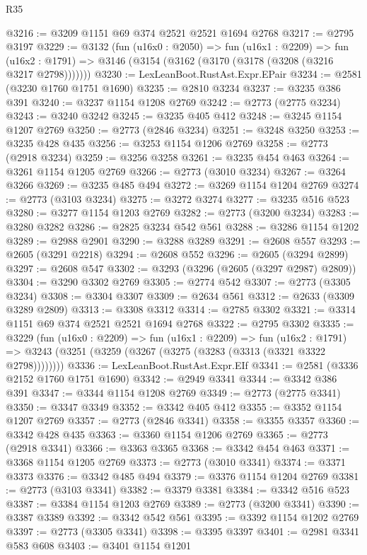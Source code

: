 \begin{lexlean}{R35}
\begin{coremodule}
@3216 := @3209 @1151 @69 @374 @2521 @2521 @1694 @2768
@3217 := @2795 @3197
@3229 := @3132
    (fun (u16x0 : @2050) =>
    fun (u16x1 : @2209) =>
    fun (u16x2 : @1791) => @3146 (@3154 (@3162 (@3170 (@3178 (@3208 (@3216 @3217 @2798)))))))
@3230 := LexLeanBoot.RustAst.Expr.EPair
@3234 := @2581 (@3230 @1760 @1751 @1690)
@3235 := @2810 @3234
@3237 := @3235 @386 @391
@3240 := @3237 @1154 @1208 @2769
@3242 := @2773 (@2775 @3234)
@3243 := @3240 @3242
@3245 := @3235 @405 @412
@3248 := @3245 @1154 @1207 @2769
@3250 := @2773 (@2846 @3234)
@3251 := @3248 @3250
@3253 := @3235 @428 @435
@3256 := @3253 @1154 @1206 @2769
@3258 := @2773 (@2918 @3234)
@3259 := @3256 @3258
@3261 := @3235 @454 @463
@3264 := @3261 @1154 @1205 @2769
@3266 := @2773 (@3010 @3234)
@3267 := @3264 @3266
@3269 := @3235 @485 @494
@3272 := @3269 @1154 @1204 @2769
@3274 := @2773 (@3103 @3234)
@3275 := @3272 @3274
@3277 := @3235 @516 @523
@3280 := @3277 @1154 @1203 @2769
@3282 := @2773 (@3200 @3234)
@3283 := @3280 @3282
@3286 := @2825 @3234 @542 @561
@3288 := @3286 @1154 @1202
@3289 := @2988 @2901
@3290 := @3288 @3289
@3291 := @2608 @557
@3293 := @2605 (@3291 @2218)
@3294 := @2608 @552
@3296 := @2605 (@3294 @2899)
@3297 := @2608 @547
@3302 := @3293 (@3296 (@2605 (@3297 @2987) @2809))
@3304 := @3290 @3302 @2769
@3305 := @2774 @542
@3307 := @2773 (@3305 @3234)
@3308 := @3304 @3307
@3309 := @2634 @561
@3312 := @2633 (@3309 @3289 @2809)
@3313 := @3308 @3312
@3314 := @2785 @3302
@3321 := @3314 @1151 @69 @374 @2521 @2521 @1694 @2768
@3322 := @2795 @3302
@3335 := @3229
    (fun (u16x0 : @2209) =>
    fun (u16x1 : @2209) =>
    fun (u16x2 : @1791) =>
    @3243 (@3251 (@3259 (@3267 (@3275 (@3283 (@3313 (@3321 @3322 @2798))))))))
@3336 := LexLeanBoot.RustAst.Expr.EIf
@3341 := @2581 (@3336 @2152 @1760 @1751 @1690)
@3342 := @2949 @3341
@3344 := @3342 @386 @391
@3347 := @3344 @1154 @1208 @2769
@3349 := @2773 (@2775 @3341)
@3350 := @3347 @3349
@3352 := @3342 @405 @412
@3355 := @3352 @1154 @1207 @2769
@3357 := @2773 (@2846 @3341)
@3358 := @3355 @3357
@3360 := @3342 @428 @435
@3363 := @3360 @1154 @1206 @2769
@3365 := @2773 (@2918 @3341)
@3366 := @3363 @3365
@3368 := @3342 @454 @463
@3371 := @3368 @1154 @1205 @2769
@3373 := @2773 (@3010 @3341)
@3374 := @3371 @3373
@3376 := @3342 @485 @494
@3379 := @3376 @1154 @1204 @2769
@3381 := @2773 (@3103 @3341)
@3382 := @3379 @3381
@3384 := @3342 @516 @523
@3387 := @3384 @1154 @1203 @2769
@3389 := @2773 (@3200 @3341)
@3390 := @3387 @3389
@3392 := @3342 @542 @561
@3395 := @3392 @1154 @1202 @2769
@3397 := @2773 (@3305 @3341)
@3398 := @3395 @3397
@3401 := @2981 @3341 @583 @608
@3403 := @3401 @1154 @1201

\end{coremodule}
\end{lexlean}
